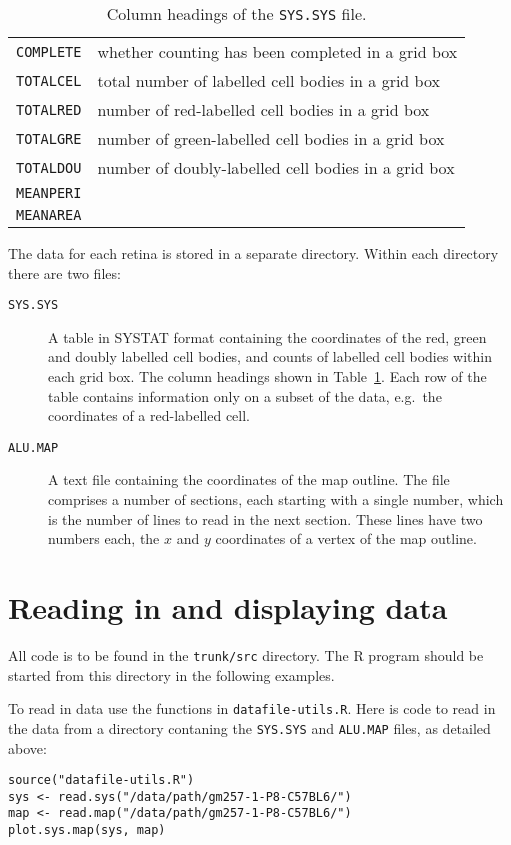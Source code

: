 \documentclass{article}
\begin{document}
\begin{table}
\begin{tabular}{ll}
    \texttt{COMPLETE} & whether counting has been completed in a grid
    box \\
    \texttt{TOTALCEL} & total number of labelled cell bodies in a grid box \\
    \texttt{TOTALRED} & number of red-labelled cell bodies in a grid box \\
    \texttt{TOTALGRE} & number of green-labelled cell bodies in a grid box \\
    \texttt{TOTALDOU} & number of doubly-labelled cell bodies in a grid box \\
    \texttt{MEANPERI} & \\
    \texttt{MEANAREA} & \\
  \end{tabular}
  \caption{Column headings of the \texttt{SYS.SYS} file.}
  \label{tab:data-format}
\end{table}

The data for each retina is stored in a separate directory. Within
each directory there are two files:
\begin{description}
\item[\texttt{SYS.SYS}] A table in SYSTAT format containing the
  coordinates of the red, green and doubly labelled cell bodies, and
  counts of labelled cell bodies within each grid box. The column
  headings shown in Table~\ref{tab:data-format}.  Each row of the
  table contains information only on a subset of the data, e.g.\ the
  coordinates of a red-labelled cell.
\item[\texttt{ALU.MAP}] A text file containing the coordinates of the
  map outline. The file comprises a number of sections, each starting
  with a single number, which is the number of lines to read in the
  next section. These lines have two numbers each, the $x$ and $y$
  coordinates of a vertex of the map outline.
\end{description}

\section{Reading in and displaying data}
\label{manual:sec:datafile-utils}

All code is to be found in the \texttt{trunk/src} directory. The R
program should be started from this directory in the following examples.

To read in data use the functions in \texttt{datafile-utils.R}. Here
is code to read in the data from a directory contaning the
\texttt{SYS.SYS} and \texttt{ALU.MAP} files, as detailed above:
\begin{verbatim}
source("datafile-utils.R")
sys <- read.sys("/data/path/gm257-1-P8-C57BL6/")
map <- read.map("/data/path/gm257-1-P8-C57BL6/")
plot.sys.map(sys, map)
\end{verbatim}
\end{document}
